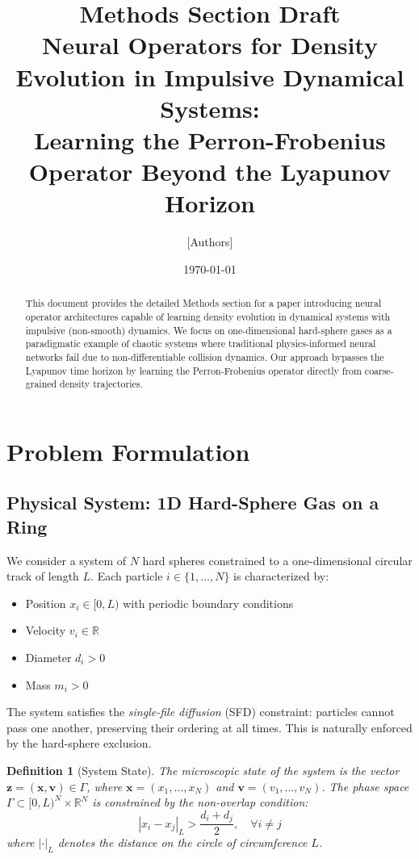 \documentclass[11pt]{article}
\title{\textbf{Methods Section Draft} \\ 
\Large Neural Operators for Density Evolution in Impulsive Dynamical Systems: \\
Learning the Perron-Frobenius Operator Beyond the Lyapunov Horizon}
\author{[Authors]}
\date{\today}
\newcommand{\R}{\mathbb{R}}
\newtheorem{definition}{Definition}
\begin{document}
\maketitle

\begin{abstract}
This document provides the detailed Methods section for a paper introducing neural operator architectures capable of learning density evolution in dynamical systems with impulsive (non-smooth) dynamics. We focus on one-dimensional hard-sphere gases as a paradigmatic example of chaotic systems where traditional physics-informed neural networks fail due to non-differentiable collision dynamics. Our approach bypasses the Lyapunov time horizon by learning the Perron-Frobenius operator directly from coarse-grained density trajectories.
\end{abstract}

\tableofcontents
\newpage

\section{Problem Formulation}

\subsection{Physical System: 1D Hard-Sphere Gas on a Ring}

We consider a system of $N$ hard spheres constrained to a one-dimensional circular track of length $L$. Each particle $i \in \{1, \ldots, N\}$ is characterized by:
\begin{itemize}
    \item Position $x_i \in [0, L)$ with periodic boundary conditions
    \item Velocity $v_i \in \R$
    \item Diameter $d_i > 0$
    \item Mass $m_i > 0$
\end{itemize}

The system satisfies the \textit{single-file diffusion} (SFD) constraint: particles cannot pass one another, preserving their ordering at all times. This is naturally enforced by the hard-sphere exclusion.

\begin{definition}[System State]
The microscopic state of the system is the vector $\bm{z} = (\bm{x}, \bm{v}) \in \Gamma$, where $\bm{x} = (x_1, \ldots, x_N)$ and $\bm{v} = (v_1, \ldots, v_N)$. The phase space $\Gamma \subset [0, L)^N \times \R^N$ is constrained by the non-overlap condition:
\begin{equation}
    |x_i - x_j|_L > \frac{d_i + d_j}{2}, \quad \forall i \neq j
\end{equation}
where $|\cdot|_L$ denotes the distance on the circle of circumference $L$.
\end{definition}
\end{document}
